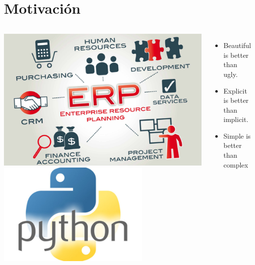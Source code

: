 

\section{Motivación}

{

	\begin{frame}{}
        \begin{columns}
            \includegraphics[width=\textwidth]{./Images/erp-explicacion.jpg}
            \includegraphics[width=0.7\textwidth]{./Images/python.jpg}
            \begin{itemize}
                \item Beautiful is better than ugly.
                \item Explicit is better than implicit.
                \item Simple is better than complex
            \end{itemize}
        \end{columns}

	\end{frame}
}
